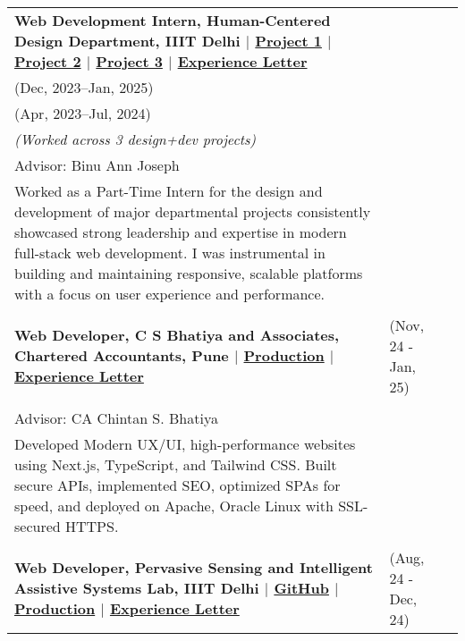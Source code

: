\documentclass[10pt]{extarticle}
\begin{document}
\begin{contained}
\\
\begingroup%
\renewcommand\arraystretch{1}%
\begin{longtable}{p{}p{}p{}}
    \textbf{Web Development Intern, Human-Centered Design Department, IIIT Delhi  
      $\vert$ \href{https://hcd.iiitd.ac.in/}{Project 1} $\vert$ \href{https://1pxdesignconf.iiitd.edu.in/}{Project 2} $\vert$ \href{https://dss2025.iiitd.edu.in/}{Project 3}  $\vert$
    \href{https://drive.google.com/file/d/1ZBmdpn35tOQ6O-hA4DlZQFGS6P-6t2TZ/view?usp=sharing}{Experience Letter} } &
    \begin{tabular}[t]{@{}l@{}}
    (Mar, 2025-Apr, 2025) \\
    (Dec, 2023–Jan, 2025) \\
    (Apr, 2023–Jul, 2024)
\end{tabular}
\\ \textit{(Worked across 3 design+dev projects)} \\ %
    {Advisor: Binu Ann Joseph}\\ Worked
    as a Part-Time Intern for the design and development of major departmental projects
consistently showcased strong leadership and expertise in modern full-stack web
development. I was instrumental in building and maintaining responsive, scalable platforms
with a focus on user experience and performance.\\
    \\
\textbf{Web Developer, C S Bhatiya and Associates, Chartered Accountants, Pune $\vert$ \href{https://csbhatiya.com/}{Production} $\vert$ \href{https://drive.google.com/file/d/1ERZEwunqZLcGdk9Fz-A9g0KW0qIyfU5l/view?usp=sharing}{Experience Letter} } &(Nov, 24 - Jan, 25)\\\\
    {Advisor: CA Chintan S. Bhatiya}\\
    Developed Modern UX/UI, high-performance websites using Next.js, TypeScript, and Tailwind CSS. Built secure APIs, implemented SEO, optimized SPAs for speed, and deployed on Apache, Oracle Linux with SSL-secured HTTPS.\\
    \\
    \textbf{Web Developer, Pervasive Sensing and Intelligent Assistive Systems Lab, IIIT Delhi $\vert$ \href{https://github.com/kintsugi-programmer/PerSIsst-Lab}{GitHub} $\vert$ \href{https://persisst.iiitd.edu.in/}{Production} $\vert$ \href{https://drive.google.com/file/d/1uVUchMiUUwhLph9rYhSjSyHx-VntRaQw/view?usp=sharing}{Experience Letter} } &(Aug, 24 - Dec, 24)\\

\end{longtable}
\end{contained}
\end{document}
